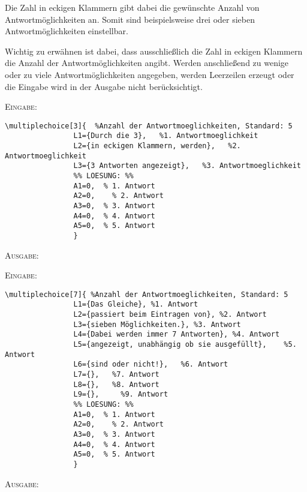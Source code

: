 \documentclass[a4paper,12pt]{article}
\begin{document}
\leer

Die Zahl in eckigen Klammern gibt dabei die gewünschte Anzahl von Antwortmöglichkeiten an. Somit sind beispielsweise drei oder sieben Antwortmöglichkeiten einstellbar. \leer

Wichtig zu erwähnen ist dabei, dass ausschließlich die Zahl in eckigen Klammern die Anzahl der Antwortmöglichkeiten angibt. Werden anschließend zu wenige oder zu viele Antwortmöglichkeiten angegeben, werden Leerzeilen erzeugt oder die Eingabe wird in der Ausgabe nicht berücksichtigt. 

\leer

\textsc{Eingabe:} \setcounter{Antworten}{0}
\begin{verbatim}
\multiplechoice[3]{  %Anzahl der Antwortmoeglichkeiten, Standard: 5
				L1={Durch die 3},   %1. Antwortmoeglichkeit 
				L2={in eckigen Klammern, werden},   %2. Antwortmoeglichkeit
				L3={3 Antworten angezeigt},   %3. Antwortmoeglichkeit
				%% LOESUNG: %%
				A1=0,  % 1. Antwort
				A2=0,	 % 2. Antwort
				A3=0,  % 3. Antwort
				A4=0,  % 4. Antwort
				A5=0,  % 5. Antwort
				}
\end{verbatim}
\leer

\textsc{Ausgabe:}\leer



\textsc{Eingabe:}

\begin{verbatim}
\multiplechoice[7]{ %Anzahl der Antwortmoeglichkeiten, Standard: 5
				L1={Das Gleiche}, %1. Antwort 
				L2={passiert beim Eintragen von}, %2. Antwort
				L3={sieben Möglichkeiten.}, %3. Antwort
				L4={Dabei werden immer 7 Antworten}, %4. Antwort
				L5={angezeigt, unabhängig ob sie ausgefüllt},	 %5. Antwort
				L6={sind oder nicht!},	 %6. Antwort
				L7={},	 %7. Antwort
				L8={},	 %8. Antwort
				L9={},	   %9. Antwort
				%% LOESUNG: %%
				A1=0,  % 1. Antwort
				A2=0,	 % 2. Antwort
				A3=0,  % 3. Antwort
				A4=0,  % 4. Antwort
				A5=0,  % 5. Antwort
				}
\end{verbatim}

\leer

\textsc{Ausgabe:}
\end{document}
